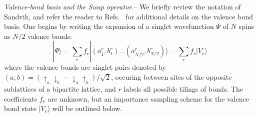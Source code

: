 \documentclass[prl,aps,twocolumn,floatfix,amsmath,amssymb,superscriptaddress,tightenlines]{revtex4}
\begin{document}
{\it Valence-bond basis and the Swap operator.}-- We briefly review the notation of Sandvik, and refer the reader to 
Refs.~\cite{Sandvik,Beach,AWSloop} for additional details on the valence bond basis.
One begins by writing the expansion of a singlet
wavefunction $\Psi$ of $N$ spins as $N/2$ valence bonds:
\begin{equation}
| \Psi \rangle = \sum_r f_r|(a^r_1,b^r_1) \ldots (a^r_{N/2},b^r_{N/2}) \rangle = \sum_r f_r| V_r \rangle
\end{equation}
where the valence bonds are singlet pairs denoted by $(a,b) = (\uparrow_a \downarrow_b - \downarrow_a \uparrow_b)/\sqrt{2}$,
occuring between sites of the opposite sublattices of a bipartite lattice, and $r$ labels all possible tilings of bonds.  The coefficients $f_r$ are unknown, but an importance sampling scheme \cite{Sandvik} for the valence bond state $| V_r \rangle$ will be outlined below.  
\end{document}
